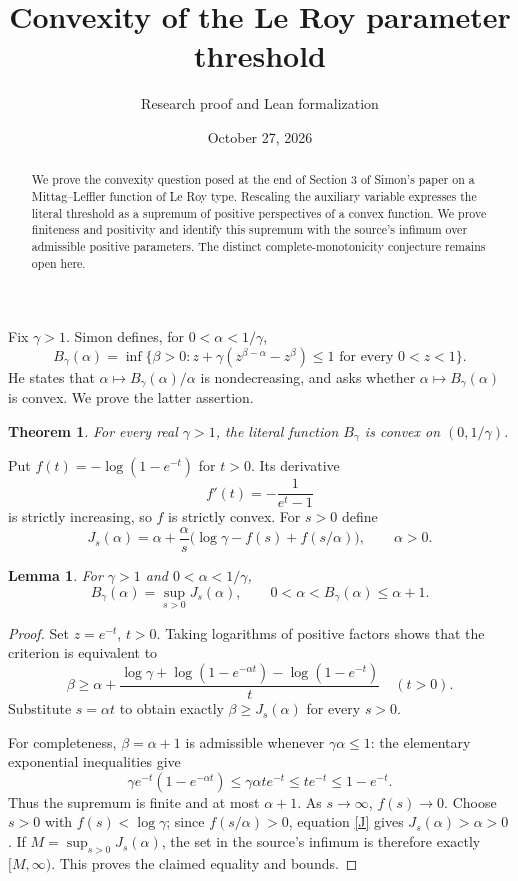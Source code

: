 \documentclass[11pt]{article}
\title{Convexity of the Le Roy parameter threshold}
\author{Research proof and Lean formalization}
\date{October 27, 2026}
\newtheorem{theorem}{Theorem}
\newtheorem{lemma}{Lemma}
\begin{document}
\maketitle
\begin{abstract}
We prove the convexity question posed at the end of Section 3 of Simon's paper on a Mittag--Leffler function of Le Roy type. Rescaling the auxiliary variable expresses the literal threshold as a supremum of positive perspectives of a convex function. We prove finiteness and positivity and identify this supremum with the source's infimum over admissible positive parameters. The distinct complete-monotonicity conjecture remains open here.
\end{abstract}

Fix $\gamma>1$. Simon \cite[p.~5, Section 3]{Simon} defines, for $0<\alpha<1/\gamma$,
\[
 B_\gamma(\alpha)=\inf\{\beta>0:
 z+\gamma(z^{\beta-\alpha}-z^\beta)\leq1\text{ for every }0<z<1\}.
\]
He states that $\alpha\mapsto B_\gamma(\alpha)/\alpha$ is nondecreasing, and asks whether $\alpha\mapsto B_\gamma(\alpha)$ is convex. We prove the latter assertion.
\begin{theorem}
For every real $\gamma>1$, the literal function $B_\gamma$ is convex on $(0,1/\gamma)$.
\end{theorem}

Put $f(t)=-\log(1-e^{-t})$ for $t>0$. Its derivative
\[
 f'(t)=-\frac{1}{e^t-1}
\]
is strictly increasing, so $f$ is strictly convex. For $s>0$ define
\begin{equation}\label{J}
 J_s(\alpha)=\alpha+\frac{\alpha}{s}
       \bigl(\log\gamma-f(s)+f(s/\alpha)\bigr),\qquad\alpha>0.
\end{equation}

\begin{lemma}\label{representation}
For $\gamma>1$ and $0<\alpha<1/\gamma$,
\[
 B_\gamma(\alpha)=\sup_{s>0}J_s(\alpha),\qquad
 0<\alpha< B_\gamma(\alpha)\leq\alpha+1.
\]
\end{lemma}
\begin{proof}
Set $z=e^{-t}$, $t>0$. Taking logarithms of positive factors shows that the criterion is equivalent to
\[
 \beta\geq \alpha+
 \frac{\log\gamma+\log(1-e^{-\alpha t})-\log(1-e^{-t})}{t}
 \quad(t>0).
\]
Substitute $s=\alpha t$ to obtain exactly $\beta\geq J_s(\alpha)$ for every $s>0$.

For completeness, $\beta=\alpha+1$ is admissible whenever $\gamma\alpha\leq1$: the elementary exponential inequalities give
\[
 \gamma e^{-t}(1-e^{-\alpha t})
 \leq\gamma\alpha te^{-t}\leq te^{-t}\leq1-e^{-t}.
\]
Thus the supremum is finite and at most $\alpha+1$. As $s\to\infty$, $f(s)\to0$. Choose $s>0$ with $f(s)<\log\gamma$; since $f(s/\alpha)>0$, equation \eqref{J} gives $J_s(\alpha)>\alpha>0$. If $M=\sup_{s>0}J_s(\alpha)$, the set in the source's infimum is therefore exactly $[M,\infty)$. This proves the claimed equality and bounds.
\end{proof}
\end{document}
